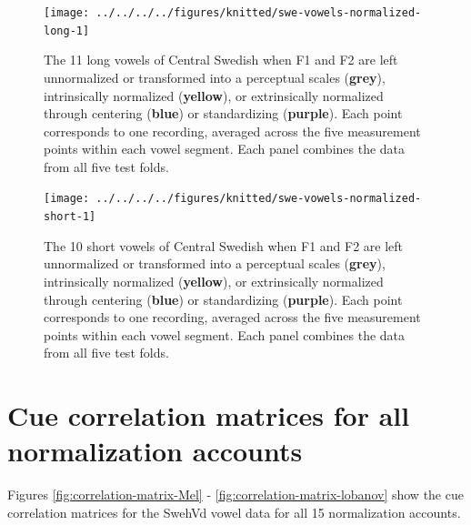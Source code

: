 \documentclass[utf8]{frontiers_suppmat} %
\begin{document}
\begin{landscape}
\begin{figure}

{\centering \texttt{[image: ../../../../figures/knitted/swe-vowels-normalized-long-1]} 

}

\caption{The 11 long vowels of Central Swedish when F1 and F2 are left unnormalized or transformed into a perceptual scales (\textbf{grey}), intrinsically normalized (\textbf{yellow}), or extrinsically normalized through centering (\textbf{blue}) or standardizing (\textbf{purple}). Each point corresponds to one recording, averaged across the five measurement points within each vowel segment. Each panel combines the data from all five test folds.}\label{fig:swe-vowels-normalized-long}
\end{figure}

\end{landscape}

\begin{landscape}

\begin{figure}

{\centering \texttt{[image: ../../../../figures/knitted/swe-vowels-normalized-short-1]} 

}

\caption{The 10 short vowels of Central Swedish when F1 and F2 are left unnormalized or transformed into a perceptual scales (\textbf{grey}), intrinsically normalized (\textbf{yellow}), or extrinsically normalized through centering (\textbf{blue}) or standardizing (\textbf{purple}). Each point corresponds to one recording, averaged across the five measurement points within each vowel segment. Each panel combines the data from all five test folds.}\label{fig:swe-vowels-normalized-short}
\end{figure}

\end{landscape}




\hypertarget{sec:correlation-matrices}{%
\section{Cue correlation matrices for all normalization accounts}\label{sec:correlation-matrices}}

Figures \ref{fig:correlation-matrix-Mel} - \ref{fig:correlation-matrix-lobanov} show the cue correlation matrices for the SwehVd vowel data for all 15 normalization accounts.
\end{document}
